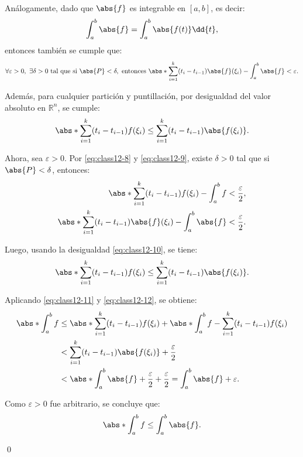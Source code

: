 Análogamente, dado que \( \abs{f} \) es integrable en \([a,b]\), es decir:
\begin{equation*}
	\int_a^b \abs{f} = \int_a^b \abs{f(t)} \dd{t}, 
\end{equation*}
entonces también se cumple que:
\begin{equation}
	\forall \varepsilon > 0,\ \exists \delta > 0\ \text{tal que si } \abs{P} < \delta,\ \text{entonces } \abs*{ \sum_{i=1}^k (t_i - t_{i-1}) \abs{f}(\xi_i) - \int_a^b \abs{f} } < \varepsilon.
	\label{eq:class12-9}
\end{equation}

Además, para cualquier partición y puntillación, por desigualdad del valor absoluto en \( \mathbb{R}^n \), se cumple:
\begin{equation}
	\abs*{ \sum_{i=1}^k (t_i - t_{i-1}) f(\xi_i) } \leq \sum_{i=1}^k (t_i - t_{i-1}) \abs{f(\xi_i)}.
	\label{eq:class12-10}
\end{equation}

Ahora, sea \( \varepsilon > 0 \). Por \eqref{eq:class12-8} y \eqref{eq:class12-9}, existe \( \delta > 0 \) tal que si \( \abs{P} < \delta \), entonces:
\begin{align}
	\abs*{ \sum_{i=1}^k (t_i - t_{i-1}) f(\xi_i) - \int_a^b f } &< \frac{\varepsilon}{2}, \label{eq:class12-11} \\
	\abs*{ \sum_{i=1}^k (t_i - t_{i-1}) \abs{f}(\xi_i) - \int_a^b \abs{f} } &< \frac{\varepsilon}{2}. \label{eq:class12-12}
\end{align}

Luego, usando la desigualdad \eqref{eq:class12-10}, se tiene:
\[
\abs*{ \sum_{i=1}^k (t_i - t_{i-1}) f(\xi_i) }
\leq \sum_{i=1}^k (t_i - t_{i-1}) \abs{f(\xi_i)}.
\]

Aplicando \eqref{eq:class12-11} y \eqref{eq:class12-12}, se obtiene:
\begin{align*}
	\abs*{ \int_a^b f }
	&\leq \abs*{ \sum_{i=1}^k (t_i - t_{i-1}) f(\xi_i) } + \abs*{ \int_a^b f - \sum_{i=1}^k (t_i - t_{i-1}) f(\xi_i) } \\
	&< \sum_{i=1}^k (t_i - t_{i-1}) \abs{f(\xi_i)} + \frac{\varepsilon}{2} \\
	&< \abs*{ \int_a^b \abs{f} } + \frac{\varepsilon}{2} + \frac{\varepsilon}{2} = \int_a^b \abs{f} + \varepsilon.
\end{align*}

Como \( \varepsilon > 0 \) fue arbitrario, se concluye que:
\begin{equation*}
	\abs*{ \int_a^b f } \leq \int_a^b \abs{f}.
	\label{eq:final-ineq}
\end{equation*}

\qed





